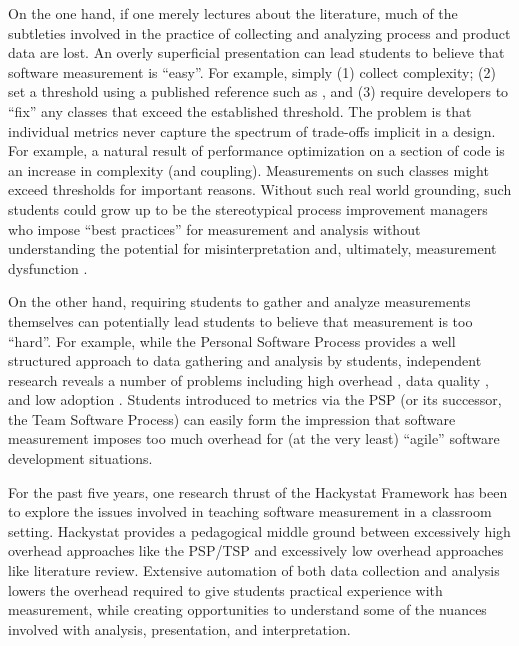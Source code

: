\documentclass{acm_proc_article-sp}
\begin{document}
On the one hand, if one merely lectures about the literature, much of the
subtleties involved in the practice of collecting and analyzing process and
product data are lost.  An overly superficial presentation can lead
students to believe that software measurement is ``easy''. For example,
simply (1) collect complexity; (2) set a threshold using a published
reference such as \cite{Clark08}, and (3) require developers to ``fix'' any
classes that exceed the established threshold.  The problem is that
individual metrics never capture the spectrum of trade-offs implicit in a
design. For example, a natural result of performance optimization on a
section of code is an increase in complexity (and coupling). Measurements
on such classes might exceed thresholds for important reasons.  Without
such real world grounding, such students could grow up to be the
stereotypical process improvement managers who impose ``best practices''
for measurement and analysis without understanding the potential for
misinterpretation and, ultimately, measurement dysfunction \cite{Austin96}.

On the other hand, requiring students to gather and analyze measurements
themselves can potentially lead students to believe that measurement is too
``hard''.  For example, while the Personal Software Process
\cite{Humphrey95} provides a well structured approach to data gathering and
analysis by students, independent research reveals a number of problems
including high overhead \cite{csdl2-01-12}, data quality \cite{csdl-98-13},
and low adoption \cite{Borstler02}.  Students introduced to metrics via the
PSP (or its successor, the Team Software Process) can easily form the
impression that software measurement imposes too much overhead for (at the very
least) ``agile'' software development situations.

For the past five years, one research thrust of the Hackystat Framework has
been to explore the issues involved in teaching software measurement in a
classroom setting.  Hackystat provides a pedagogical middle ground between
excessively high overhead approaches like the PSP/TSP and excessively low
overhead approaches like literature review.  Extensive automation of both
data collection and analysis lowers the overhead required to give students
practical experience with measurement, while creating opportunities to
understand some of the nuances involved with analysis, presentation, and
interpretation.
\end{document}
